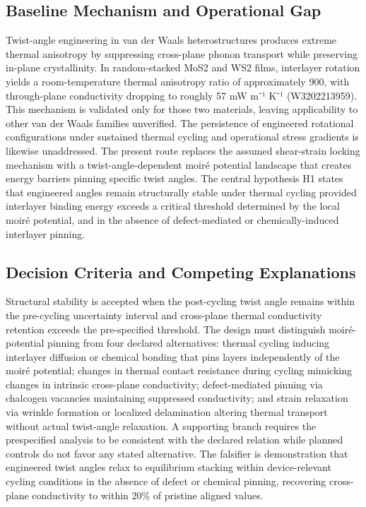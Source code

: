 \documentclass[conference]{IEEEtran}
\begin{document}
\subsection{Baseline Mechanism and Operational Gap}
Twist-angle engineering in van der Waals heterostructures produces extreme thermal anisotropy by suppressing cross-plane phonon transport while preserving in-plane crystallinity. In random-stacked MoS2 and WS2 films, interlayer rotation yields a room-temperature thermal anisotropy ratio of approximately 900, with through-plane conductivity dropping to roughly 57 mW m⁻¹ K⁻¹ (W3202213959). This mechanism is validated only for those two materials, leaving applicability to other van der Waals families unverified. The persistence of engineered rotational configurations under sustained thermal cycling and operational stress gradients is likewise unaddressed. The present route replaces the assumed shear-strain locking mechanism with a twist-angle-dependent moiré potential landscape that creates energy barriers pinning specific twist angles. The central hypothesis H1 states that engineered angles remain structurally stable under thermal cycling provided interlayer binding energy exceeds a critical threshold determined by the local moiré potential, and in the absence of defect-mediated or chemically-induced interlayer pinning.~\cite{cite_26ecaf73d88dfe33}

\subsection{Decision Criteria and Competing Explanations}
Structural stability is accepted when the post-cycling twist angle remains within the pre-cycling uncertainty interval and cross-plane thermal conductivity retention exceeds the pre-specified threshold. The design must distinguish moiré-potential pinning from four declared alternatives: thermal cycling inducing interlayer diffusion or chemical bonding that pins layers independently of the moiré potential; changes in thermal contact resistance during cycling mimicking changes in intrinsic cross-plane conductivity; defect-mediated pinning via chalcogen vacancies maintaining suppressed conductivity; and strain relaxation via wrinkle formation or localized delamination altering thermal transport without actual twist-angle relaxation. A supporting branch requires the prespecified analysis to be consistent with the declared relation while planned controls do not favor any stated alternative. The falsifier is demonstration that engineered twist angles relax to equilibrium stacking within device-relevant cycling conditions in the absence of defect or chemical pinning, recovering cross-plane conductivity to within 20\% of pristine aligned values.~\cite{cite_26ecaf73d88dfe33,cite_6b49ace365c37cc5}
\end{document}

